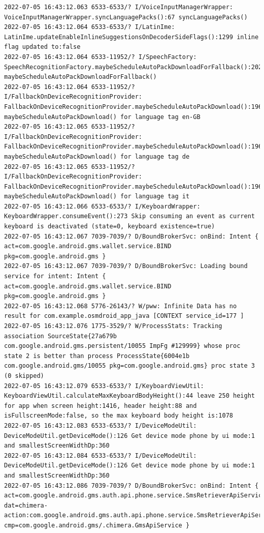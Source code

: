 \documentclass[a4paper,12pt]{book}
\begin{document}
\begin{lstlisting}
2022-07-05 16:43:12.063 6533-6533/? I/VoiceInputManagerWrapper: VoiceInputManagerWrapper.syncLanguagePacks():67 syncLanguagePacks()
2022-07-05 16:43:12.064 6533-6533/? I/LatinIme: LatinIme.updateEnableInlineSuggestionsOnDecoderSideFlags():1299 inline flag updated to:false
2022-07-05 16:43:12.064 6533-11952/? I/SpeechFactory: SpeechRecognitionFactory.maybeScheduleAutoPackDownloadForFallback():202 maybeScheduleAutoPackDownloadForFallback()
2022-07-05 16:43:12.064 6533-11952/? I/FallbackOnDeviceRecognitionProvider: FallbackOnDeviceRecognitionProvider.maybeScheduleAutoPackDownload():196 maybeScheduleAutoPackDownload() for language tag en-GB
2022-07-05 16:43:12.065 6533-11952/? I/FallbackOnDeviceRecognitionProvider: FallbackOnDeviceRecognitionProvider.maybeScheduleAutoPackDownload():196 maybeScheduleAutoPackDownload() for language tag de
2022-07-05 16:43:12.065 6533-11952/? I/FallbackOnDeviceRecognitionProvider: FallbackOnDeviceRecognitionProvider.maybeScheduleAutoPackDownload():196 maybeScheduleAutoPackDownload() for language tag it
2022-07-05 16:43:12.066 6533-6533/? I/KeyboardWrapper: KeyboardWrapper.consumeEvent():273 Skip consuming an event as current keyboard is deactivated (state=0, keyboard existence=true)
2022-07-05 16:43:12.067 7039-7039/? D/BoundBrokerSvc: onBind: Intent { act=com.google.android.gms.wallet.service.BIND pkg=com.google.android.gms }
2022-07-05 16:43:12.067 7039-7039/? D/BoundBrokerSvc: Loading bound service for intent: Intent { act=com.google.android.gms.wallet.service.BIND pkg=com.google.android.gms }
2022-07-05 16:43:12.068 5776-26143/? W/pww: Infinite Data has no result for com.example.osmdroid_app_java [CONTEXT service_id=177 ]
2022-07-05 16:43:12.076 1775-3529/? W/ProcessStats: Tracking association SourceState{27a679b com.google.android.gms.persistent/10055 ImpFg #129999} whose proc state 2 is better than process ProcessState{6004e1b com.google.android.gms/10055 pkg=com.google.android.gms} proc state 3 (0 skipped)
2022-07-05 16:43:12.079 6533-6533/? I/KeyboardViewUtil: KeyboardViewUtil.calculateMaxKeyboardBodyHeight():44 leave 250 height for app when screen height:1416, header height:88 and isFullscreenMode:false, so the max keyboard body height is:1078
2022-07-05 16:43:12.083 6533-6533/? I/DeviceModeUtil: DeviceModeUtil.getDeviceMode():126 Get device mode phone by ui mode:1 and smallestScreenWidthDp:360
2022-07-05 16:43:12.084 6533-6533/? I/DeviceModeUtil: DeviceModeUtil.getDeviceMode():126 Get device mode phone by ui mode:1 and smallestScreenWidthDp:360
2022-07-05 16:43:12.086 7039-7039/? D/BoundBrokerSvc: onBind: Intent { act=com.google.android.gms.auth.api.phone.service.SmsRetrieverApiService.START dat=chimera-action:com.google.android.gms.auth.api.phone.service.SmsRetrieverApiService.START cmp=com.google.android.gms/.chimera.GmsApiService }

\end{lstlisting}
\end{document}

